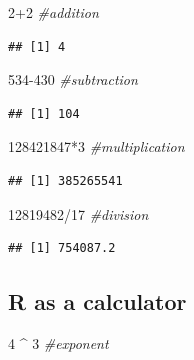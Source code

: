 \documentclass[
]{article}
\newenvironment{Shaded}{\begin{snugshade}}{\end{snugshade}}
\newcommand{\CommentTok}[1]{\textcolor[rgb]{0.56,0.35,0.01}{\textit{#1}}}
\newcommand{\DecValTok}[1]{\textcolor[rgb]{0.00,0.00,0.81}{#1}}
\newcommand{\SpecialCharTok}[1]{\textcolor[rgb]{0.00,0.00,0.00}{#1}}
\begin{document}
\begin{Shaded}
\begin{Highlighting}[]
\DecValTok{2}\SpecialCharTok{+}\DecValTok{2} \CommentTok{\#addition}
\end{Highlighting}
\end{Shaded}

\begin{verbatim}
## [1] 4
\end{verbatim}

\begin{Shaded}
\begin{Highlighting}[]
\DecValTok{534{-}430} \CommentTok{\#subtraction}
\end{Highlighting}
\end{Shaded}

\begin{verbatim}
## [1] 104
\end{verbatim}

\begin{Shaded}
\begin{Highlighting}[]
\DecValTok{128421847}\SpecialCharTok{*}\DecValTok{3} \CommentTok{\#multiplication}
\end{Highlighting}
\end{Shaded}

\begin{verbatim}
## [1] 385265541
\end{verbatim}

\begin{Shaded}
\begin{Highlighting}[]
\DecValTok{12819482}\SpecialCharTok{/}\DecValTok{17} \CommentTok{\#division}
\end{Highlighting}
\end{Shaded}

\begin{verbatim}
## [1] 754087.2
\end{verbatim}

\hypertarget{r-as-a-calculator-1}{%
\subsection{R as a calculator}\label{r-as-a-calculator-1}}

\begin{Shaded}
\begin{Highlighting}[]
\DecValTok{4} \SpecialCharTok{\^{}} \DecValTok{3} \CommentTok{\#exponent}
\end{Highlighting}
\end{Shaded}
\end{document}
